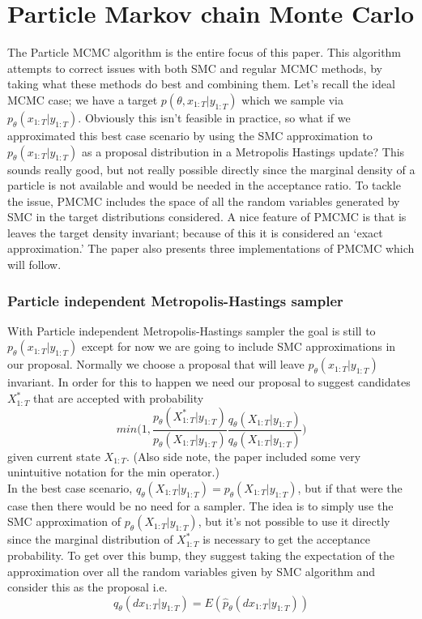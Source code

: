 \documentclass{article}\usepackage[]{graphicx}\usepackage[]{color}
\theoremstyle{definition}
\begin{document}
\section{Particle Markov chain Monte Carlo}

The Particle MCMC algorithm is the entire focus of this paper. This algorithm attempts to correct issues with both SMC and regular MCMC methods, by taking what these methods do best and combining them. Let's recall the ideal MCMC case; we have a target $p(\theta, x_{1:T}|y_{1:T})$ which we sample via $p_\theta(x_{1:T}|y_{1:T})$. Obviously this isn't feasible in practice, so what if we approximated this best case scenario by using the SMC approximation to $p_\theta(x_{1:T}|y_{1:T})$ as a proposal distribution in a Metropolis Hastings update? This sounds really good, but not really possible directly since the marginal density of a particle is not available and would be needed in the acceptance ratio. To tackle the issue, PMCMC includes the space of all the random variables generated by SMC in the target distributions considered. A nice feature of PMCMC is that is leaves the target density invariant; because of this it is considered an `exact approximation.' The paper also presents three implementations of PMCMC which will follow.


\subsubsection{Particle independent Metropolis-Hastings sampler}
With Particle independent Metropolis-Hastings sampler the goal is still to $p_\theta(x_{1:T}|y_{1:T})$ except for now we are going to include SMC approximations in our proposal. Normally we choose a proposal that will leave $p_\theta(x_{1:T}|y_{1:T})$ invariant. In order for this to happen we need our proposal to suggest candidates $X^*_{1:T}$ that are accepted with probability
\begin{equation*}
 min \Bigg( 1, \frac{p_\theta(X^*_{1:T}|y_{1:T})}{p_\theta(X_{1:T}|y_{1:T})} \frac{q_\theta(X_{1:T}|y_{1:T})}{q_\theta(X_{1:T}|y_{1:T})} \Bigg)
\end{equation*}
given current state $X_{1:T}$. (Also side note, the paper included some very unintuitive notation for the min operator.) \\

In the best case scenario, $q_\theta(X_{1:T}|y_{1:T}) = p_\theta(X_{1:T}|y_{1:T})$, but if that were the case then there would be no need for a sampler. The idea is to simply use the SMC approximation of $p_\theta(X_{1:T}|y_{1:T})$, but it's not possible to use it directly since the marginal distribution of $X^*_{1:T}$ is necessary to get the acceptance probability. To get over this bump, they suggest taking the expectation of the approximation over all the random variables given by SMC algorithm and consider this as the proposal i.e. 
\begin{equation*}
  q_\theta(dx_{1:T}|y_{1:T})  = E(\hat{p}_\theta(dx_{1:T}|y_{1:T}))
\end{equation*}
\end{document}
